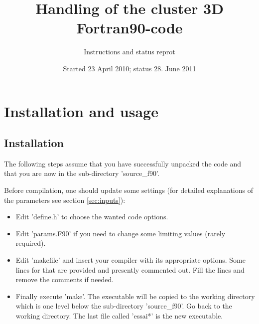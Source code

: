 \documentclass[12pt]{article}
\begin{document}
\title{Handling of the cluster 3D Fortran90-code}
\author{Instructions and status reprot}
\date{Started 23 April 2010; status 28. June 2011}
\maketitle

\tableofcontents
\newpage

\section{Installation and usage}

\subsection{Installation}
The following steps assume that you have successfully unpacked
the code and that you are now in the sub-directory 'source\_f90'.

Before compilation, one should update some settings
(for detailed explanations of the parameters see section \ref{sec:inputs}):
\begin{itemize}
\item
 Edit 'define.h' to choose the wanted code options.
\item
 Edit 'params.F90' if you need to change some limiting values
 (rarely required).
\item
 Edit 'makefile' and insert your compiler with its appropriate
 options. Some lines for that are provided and presently commented out.
 Fill the lines and remove the comments if needed.
\item
 Finally execute 'make'. The executable will be copied to the working
 directory which is one level below the sub-directory 'source\_f90'.
 Go back to the working directory. The last file called 'essai*' is
 the new executable.
\end{itemize}
\end{document}
